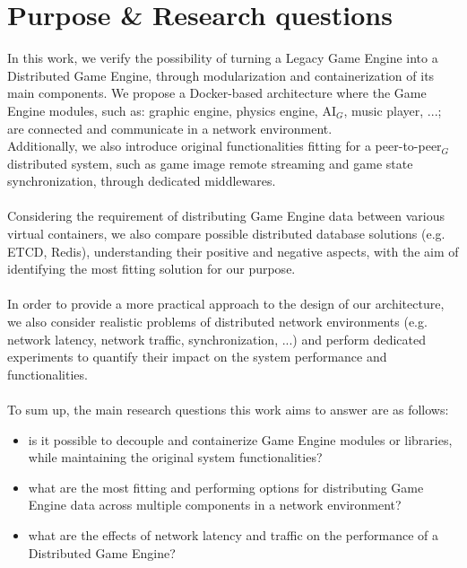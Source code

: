 \section{Purpose \& Research questions}
In this work, we verify the possibility of turning a Legacy Game Engine into a Distributed Game Engine, through modularization and containerization of its main components. We propose a Docker-based architecture where the Game Engine modules, such as: graphic engine, physics engine, AI$_G$, music player, ...; are connected and communicate in a network environment. \\
Additionally, we also introduce original functionalities fitting for a peer-to-peer$_G$ distributed system, such as game image remote streaming and game state synchronization, through dedicated middlewares. \\ \\
Considering the requirement of distributing Game Engine data between various virtual containers, we also compare possible distributed database solutions (e.g. ETCD, Redis), understanding their positive and negative aspects, with the aim of identifying the most fitting solution for our purpose. \\ \\
In order to provide a more practical approach to the design of our architecture, we also consider realistic problems of distributed network environments (e.g. network latency, network traffic, synchronization, ...) and perform dedicated experiments to quantify their impact on the system performance and functionalities. \\ \\
To sum up, the main research questions this work aims to answer are as follows:
\begin{itemize}
	\item is it possible to decouple and containerize Game Engine modules or libraries, while maintaining the original system functionalities?
	\item what are the most fitting and performing options for distributing Game Engine data across multiple components in a network environment?
	\item what are the effects of network latency and traffic on the performance of a Distributed Game Engine?
\end{itemize}